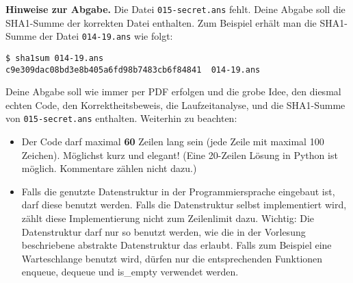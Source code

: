 \documentclass{uebung_cs}
\begin{document}
\textbf{Hinweise zur Abgabe.}
Die Datei \texttt{015-secret.ans} fehlt. Deine Abgabe soll die
SHA1-Summe der korrekten Datei enthalten. Zum Beispiel erhält man die SHA1-Summe der Datei \texttt{014-19.ans} wie folgt:
\begin{verbatim}
$ sha1sum 014-19.ans 
c9e309dac08bd3e8b405a6fd98b7483cb6f84841  014-19.ans
\end{verbatim}
Deine Abgabe soll wie immer per PDF erfolgen und die grobe Idee, den diesmal echten Code, den Korrektheitsbeweis, die Laufzeitanalyse, und die SHA1-Summe von \texttt{015-secret.ans} enthalten.
Weiterhin zu beachten:
\begin{itemize}
\item Der Code darf maximal \textbf{60} Zeilen lang sein (jede Zeile mit maximal 100 Zeichen). Möglichst kurz und elegant! (Eine 20-Zeilen Lösung in Python ist möglich. Kommentare zählen nicht dazu.)
\item Falls die genutzte Datenstruktur in der Programmiersprache eingebaut ist, darf diese benutzt werden. Falls die Datenstruktur selbst implementiert wird, zählt diese Implementierung nicht zum Zeilenlimit dazu. Wichtig: Die Datenstruktur darf nur so benutzt werden, wie die in der Vorlesung beschriebene abstrakte Datenstruktur das erlaubt. Falls zum Beispiel eine Warteschlange benutzt wird, dürfen nur die entsprechenden Funktionen enqueue, dequeue und is\_empty verwendet werden.
\end{itemize}
\end{document}
